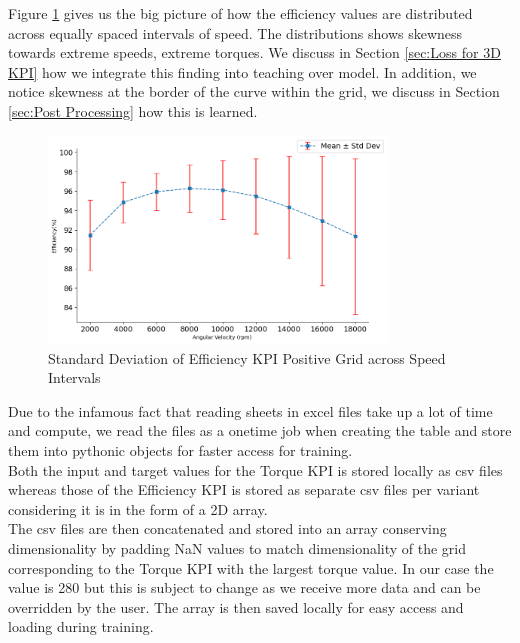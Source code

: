 \documentclass{report} %
\begin{document}
Figure \ref{fig:Standard Deviation of 3D KPI(Efficiency) Positive Grid across Speed Intervals} gives us the big picture of how the efficiency values are distributed across equally spaced intervals of speed.
The distributions shows skewness towards extreme speeds, extreme torques. We discuss in Section \ref{sec:Loss for 3D KPI} how we integrate this finding into teaching over model.
In addition, we notice skewness at the border of the curve within the grid, we discuss in Section \ref{sec:Post Processing} how this is learned.
\begin{figure}[H]
    \centering
    \includegraphics[width=0.8\textwidth]{./ReportImages/stddev_y2_nn_Target.png} 
    \caption{Standard Deviation of Efficiency \ac{KPI} Positive Grid across Speed Intervals} 
    \label{fig:Standard Deviation of 3D KPI(Efficiency) Positive Grid across Speed Intervals}
\end{figure}

Due to the infamous fact that reading sheets in excel files take up a lot of time and compute, we read the files as a onetime job when creating the table and store them into pythonic objects for faster access for training.\\
Both the input and target values for the Torque \ac{KPI} is stored locally as csv files whereas those of the Efficiency \ac{KPI} is stored as separate csv files per variant considering it is in the form of a 2\ac{D} array.\\
The csv files are then concatenated and stored into an array conserving dimensionality by padding \ac{NaN} values to match dimensionality of the grid corresponding to the Torque \ac{KPI} with the largest torque value.
In our case the value is 280 but this is subject to change as we receive more data and can be overridden by the user.
The array is then saved locally for easy access and loading during training.\\
\end{document}
